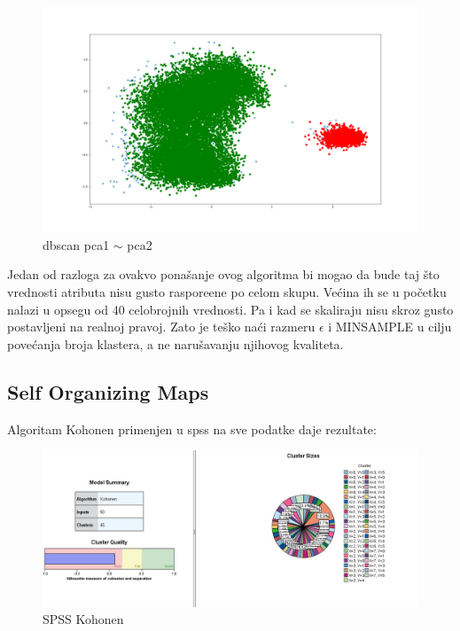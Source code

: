\documentclass[a4paper, 11pt]{article}
\begin{document}
\begin{figure}[h]
\centering
\graphicspath{{../}}
\includegraphics[scale=0.15]{dbscan_pca_035_15.png}
\caption{dbscan pca1 $\sim$ pca2}
\end{figure}


Jedan od razloga za ovakvo pona\v{s}anje ovog algoritma bi mogao da bude
taj \v{s}to vrednosti atributa nisu gusto raspore\dj{}ene po celom skupu.
Ve\'{c}ina ih se u po\v{c}etku nalazi u opsegu od 40 celobrojnih vrednosti.
Pa i kad se skaliraju nisu skroz gusto postavljeni na realnoj pravoj.
Zato je te\v{s}ko na\'{c}i razmeru $\epsilon$ i MINSAMPLE u cilju pove\'{c}anja
broja klastera, a ne naru\v{s}avanju njihovog kvaliteta. 

\subsection{Self Organizing Maps}

Algoritam Kohonen primenjen u spss na sve podatke daje rezultate:
\begin{figure}[h]
\centering
\graphicspath{{../}}
\includegraphics[scale=0.35]{kohonen_spss.jpeg}
\caption{SPSS Kohonen}
\end{figure}
\end{document}
